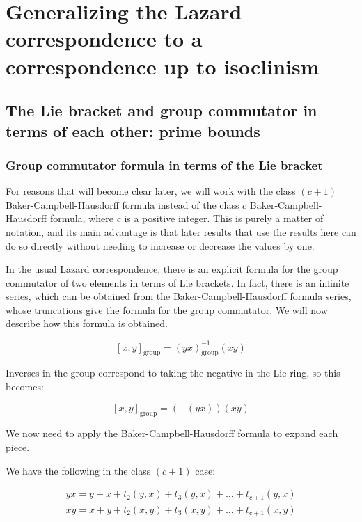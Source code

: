 \documentclass{ucetd}
\begin{document}
\chapter{Generalizing the Lazard correspondence to a correspondence up to isoclinism}

\section{The Lie bracket and group commutator in terms of each other: prime bounds}\label{sec:group-commutator-and-lie-bracket-ito-each-other}

\subsection{Group commutator formula in terms of the Lie bracket}\label{sec:group-commutator-ito-lie-bracket}

For reasons that will become clear later, we will work with the class
$(c + 1)$ Baker-Campbell-Hausdorff formula instead of the class $c$
Baker-Campbell-Hausdorff formula, where $c$ is a positive
integer. This is purely a matter of notation, and its main advantage
is that later results that use the results here can do so directly
without needing to increase or decrease the values by one.

In the usual Lazard correspondence, there is an explicit formula for
the group commutator of two elements in terms of Lie brackets. In
fact, there is an infinite series, which can be obtained from the
Baker-Campbell-Hausdorff formula series, whose truncations give the
formula for the group commutator. We will now describe how this
formula is obtained.

$$[x,y]_{\text{group}} = (yx)_{\text{group}}^{-1}(xy)$$

Inverses in the group correspond to taking the negative in the Lie
ring, so this becomes:

$$[x,y]_{\text{group}} = (-(yx))(xy)$$

We now need to apply the Baker-Campbell-Hausdorff formula to expand
each piece.

We have the following in the class $(c + 1)$ case:

\begin{eqnarray*}
  yx = y + x + t_2(y,x) + t_3(y,x) + \dots + t_{c+1}(y,x)\\
  xy = x + y + t_2(x,y) + t_3(x,y) + \dots + t_{c+1}(x,y)\\
\end{eqnarray*}
\end{document}
